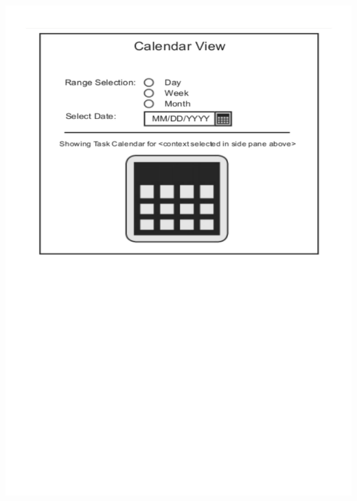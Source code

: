 \documentclass{article}
\begin{document}
\begin{center}
\includegraphics[trim = 0cm 5cm 0cm 0cm, clip=true, scale=0.7]{images/calendarview}
\end{center}
\end{document}

